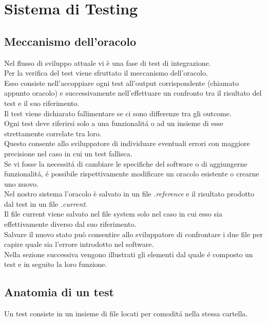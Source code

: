 \chapter{Sistema di Testing}
    \section{Meccanismo dell'oracolo\label{oracolo}}
        Nel flusso di sviluppo attuale vi è una fase di test di integrazione.\\
        Per la verifica del test viene sfruttato il meccanismo dell’oracolo.\\
        Esso consiste nell'accoppiare ogni test all'output corrispondente (chiamato appunto oracolo)
        e successivamente nell'effettuare un confronto tra il risultato del test e il suo riferimento.\\
        Il test viene dichiarato fallimentare se ci sono differenze tra gli outcome.\\
        
        Ogni test deve riferirsi solo a una funzionalit\'a o ad un insieme di esse strettamente correlate tra loro. \\
        Questo consente allo sviluppatore di individuare eventuali errori con maggiore precisione nel caso in cui un test fallisca. \\
        Se vi fosse la necessit\'a di cambiare le specifiche del software o di aggiungerne funzionalit\'a, \'e possibile rispettivamente modificare un oracolo esistente o crearne uno nuovo. \\

        Nel nostro sistema l'oracolo è salvato in un file \textit{.reference} e il risultato prodotto
        dal test in un file \textit{.current}.\\
        Il file current viene salvato nel file system solo nel caso in cui esso sia effettivamente diverso dal suo riferimento.\\
        
        Salvare il nuovo stato può consentire allo sviluppatore di confrontare i due file per capire quale sia l'errore introdotto nel software. \\
        Nella sezione successiva vengono illustrati gli elementi dal quale \'e composto un test e in seguito la loro funzione.\\
    \section{Anatomia di un test\label{testanatomy}}
        Un test consiste in un insieme di file locati per comodit\'a nella stessa cartella. \\

